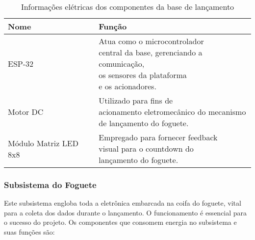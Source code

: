 \begin{table}[H]
    \centering
    \caption{Informações elétricas dos componentes da base de lançamento}
    \label{tab:componentes_base}
    \begin{tabular}{|l|l|}
        \hline
        Nome & Função \\
        \hline
        ESP-32 & \makecell[l]{Atua como o microcontrolador \\ central da base, gerenciando a comunicação, \\ os sensores da plataforma \\ e os acionadores.} \\
		\hline
        Motor DC & \makecell[l]{Utilizado para fins de \\ acionamento eletromecânico do mecanismo \\ de lançamento do foguete.} \\
		\hline
		Módulo Matriz LED 8x8 & \makecell[l]{Empregado para fornecer feedback \\ visual para o countdown do \\ lançamento do foguete.} \\
		\hline
    \end{tabular}
\end{table}

\subsubsection{Subsistema do Foguete}

Este subsistema engloba toda a eletrônica embarcada na coifa do foguete, vital para a coleta dos dados durante o lançamento. O funcionamento é essencial para o sucesso do projeto. Os componentes que consomem energia no subsistema e suas funções são: 

